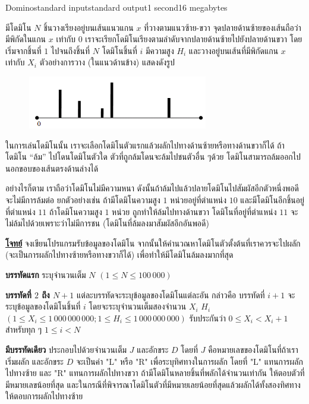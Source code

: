 \documentclass[11pt,a4paper]{article}
\begin{document}
\begin{problem}{Domino}{standard input}{standard output}{1 second}{16 megabytes}

มีโดมิโน $N$ ชิ้นวางเรียงอยู่บนเส้นแนวแกน $x$ ที่วางตามแนวซ้าย-ขวา  จุดปลายด้านซ้ายของเส้นถือว่ามีพิกัดในแกน $x$ เท่ากับ $0$ เราจะเรียกโดมิโนเรียงตามลำดับจากปลายด้านซ้ายไปยังปลายด้านขวา โดยเริ่มจากชิ้นที่ $1$ ไปจนถึงชิ้นที่ $N$ โดมิโนชิ้นที่ $i$  มีความสูง $H_i$ และวางอยู่บนเส้นที่มีพิกัดแกน $x$ เท่ากับ $X_i$  ตัวอย่างการวาง (ในแนวด้านข้าง) แสดงดังรูป

\begin{figure}[h]
\centering
\includegraphics[width=0.7\textwidth]{../latex/img/1052/1052-1.png}
\end{figure}

ในการเล่นโดมิโนนั้น  เราจะเลือกโดมิโนตัวแรกแล้วผลักไปทางด้านซ้ายหรือทางด้านขวาก็ได้  ถ้าโดมิโน “ล้ม” ไปโดนโดมิโนตัวใด  ตัวที่ถูกล้มโดนจะล้มไปชนตัวอื่น ๆด้วย โดมิโนสามารถล้มออกไปนอกขอบของเส้นตรงด้านล่างได้

อย่างไรก็ตาม เราถือว่าโดมิโนไม่มีความหนา  ดังนั้นถ้าล้มไปแล้วปลายโดมิโนไปสัมผัสอีกตัวหนึ่งพอดี จะไม่มีการล้มต่อ  ยกตัวอย่างเช่น ถ้ามีโดมิโนความสูง $1$ หน่วยอยู่ที่ตำแหน่ง $10$ และมีโดมิโนอีกชิ้นอยู่ที่ตำแหน่ง $11$ ถ้าโดมิโนความสูง $1$ หน่วย ถูกทำให้ล้มไปทางด้านขวา โดมิโนที่อยู่ที่ตำแหน่ง $11$ จะไม่ล้มไปด้วยเพราะว่าไม่มีการชน (โดมิโนที่ล้มลงมาสัมผัสอีกอันพอดี)


\bigskip
\underline{\textbf{โจทย์}}  จงเขียนโปรแกรมรับข้อมูลของโดมิโน จากนั้นให้คำนวณหาโดมิโนตัวตั้งต้นที่เราควรจะไปผลัก (จะเป็นการผลักไปทางซ้ายหรือทางขวาก็ได้)  เพื่อทำให้มีโดมิโนล้มลงมากที่สุด


\InputFile

\textbf{บรรทัดแรก} ระบุจำนวนเต็ม $N$ $(1 \leq N \leq 100\,000)$  

\textbf{บรรทัดที่ $2$ ถึง $N+1$} แต่ละบรรทัดจะระบุข้อมูลของโดมิโนแต่ละอัน กล่าวคือ บรรทัดที่ $i+1$  จะระบุข้อมูลของโดมิโนชิ้นที่ $i$ โดยจะระบุจำนวนเต็มสองจำนวน  $X_i$  $H_i$ $(1 \leq  X_i \leq 1\,000\,000\,000; 1 \leq H_i \leq 1\,000\,000\,000)$  รับประกันว่า  $0 \leq X_i < X_i+1$  สำหรับทุก ๆ  $1 \leq i < N$
\newpage

\OutputFile

\textbf{มีบรรทัดเดียว }ประกอบไปด้วยจำนวนเต็ม $J$ และอักขระ $D$ โดยที่ $J$ คือหมายเลขของโดมิโนที่ถ้าเราเริ่มผลัก และอักขระ $D$ จะเป็นค่า "L" หรือ "R" เพื่อระบุทิศทางในการผลัก โดยที่ "L" แทนการผลักไปทางซ้าย และ "R" แทนการผลักไปทางขวา  ถ้ามีโดมิโนหลายชิ้นที่พลักได้จำนวนเท่ากัน ให้ตอบตัวที่มีหมายเลขน้อยที่สุด  และในกรณีที่พิจารณาโดมิโนตัวที่มีหมายเลยน้อยที่สุดแล้วผลักได้ทั้งสองทิศทาง ให้ตอบการผลักไปทางซ้าย


\end{problem}
\end{document}
